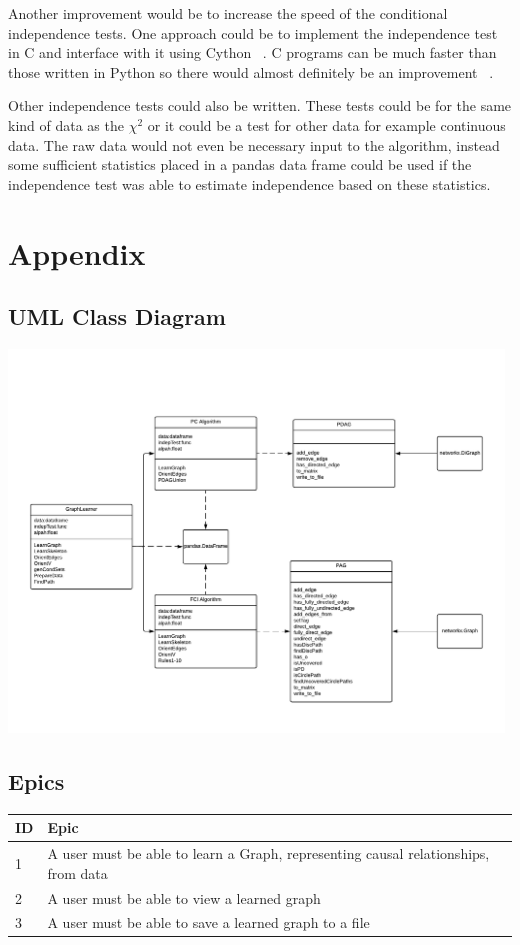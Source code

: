 \documentclass{UoYCSproject}
\begin{document}
Another improvement would be to increase the speed of the conditional independence tests. One approach could be to implement the independence test in C and interface with it using Cython ~\parencite{cython}. C programs can be much faster than those written in Python so there would almost definitely be an improvement ~\parencite{wilbers2009using}.

Other independence tests could also be written. These tests could be for the same kind of data as the $\chi^2$ or it could be a test for other data for example continuous data. The raw data would not even be necessary input to the algorithm, instead some sufficient statistics placed in a pandas data frame could be used if the independence test was able to estimate independence based on these statistics.

\printbibliography
\appendix
\chapter{Appendix}
\section{UML Class Diagram}
\includegraphics[height = 4in]{"./Causal Nets"}\\
\section{Epics}
\begin{tabular}{| l | p{12cm} |}
	\hline	
	ID & Epic \\
	\hline
	1 & A user must be able to learn a Graph, representing causal relationships, from data \\
	\hline
	2 & A user must be able to view a learned graph \\
	\hline
	3 & A user must be able to save a learned graph to a file\\
	\hline
\end{tabular}
\end{document}
